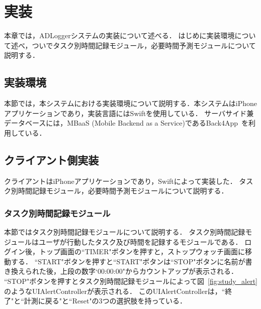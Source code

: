 \chapter{実装}
本章では，ADLoggerシステムの実装について述べる．
はじめに実装環境について述べ，ついでタスク別時間記録モジュール，必要時間予測モジュールについて説明する．

\section{実装環境}
本節では，本システムにおける実装環境について説明する．本システムはiPhoneアプリケーションであり，実装言語にはSwiftを使用している．
サーバサイド兼データベースには，MBaaS (Mobile Backend as a Service)であるBack4App~\cite{back4app}を利用している．

\section{クライアント側実装}
クライアントはiPhoneアプリケーションであり，Swiftによって実装した．
タスク別時間記録モジュール，必要時間予測モジュールについて説明する．

\subsection{タスク別時間記録モジュール}
本節ではタスク別時間記録モジュールについて説明する．
タスク別時間記録モジュールはユーザが行動したタスク及び時間を記録するモジュールである．
ログイン後，トップ画面の``TIMER"ボタンを押すと，ストップウォッチ画面に移動する．
``START"ボタンを押すと``START"ボタンは``STOP"ボタンに名前が書き換えられた後，上段の数字`00:00:00"からカウントアップが表示される．
``STOP"ボタンを押すとタスク別時間記録モジュールによって図~\ref{fig:study_alert}のようなUIAlertControllerが表示される．
このUIAlertControllerは，``終了"と``計測に戻る"と``Reset"の3つの選択肢を持っている．

